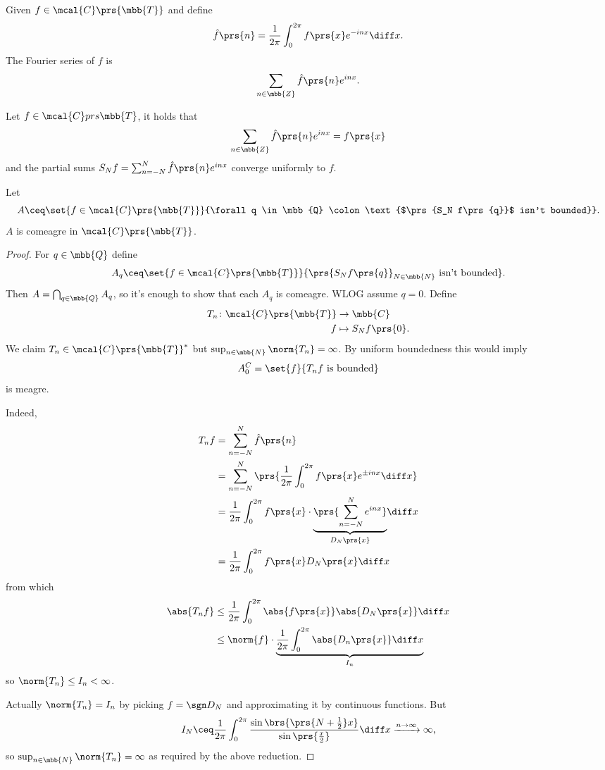 \documentclass[10pt, twoside]{book}
\begin{document}
\begin{definition}
Given $f \in \mcal{C}\prs{\mbb{T}}$ and define
\[\hat{f}\prs{n} = \frac{1}{2 \pi} \int_0^{2 \pi} f\prs{x} e^{-i n x} \diff x \text{.}\]
The Fourier series of $f$ is
\[\sum_{n \in \mbb{Z}} \hat{f}\prs{n} e^{inx} \text{.}\]
\end{definition}

\begin{theorem}[Dirichlet]
Let $f \in \mcal{C}prs{\mbb{T}}$, it holds that
\[\sum_{n \in \mbb{Z}} \hat{f}\prs{n} e^{inx} = f\prs{x}\]
and the partial sums $S_N f = \sum_{n = - N}^N \hat{f}\prs{n} e^{inx}$ converge uniformly to $f$.
\end{theorem}

\begin{theorem}
Let
\[A \ceq \set{f \in \mcal{C}\prs{\mbb{T}}}{\forall q \in \mbb{Q} \colon \text{$\prs{S_N f\prs{q}}$ isn't bounded}} \text{.}\]
$A$ is comeagre in $\mcal{C}\prs{\mbb{T}}$.
\end{theorem}

\begin{proof}
For $q \in \mbb{Q}$ define
\[A_q \ceq \set{f \in \mcal{C}\prs{\mbb{T}}}{\prs{S_N f\prs{q}}_{N \in \mbb{N}} \text{ isn't bounded}} \text{.}\]
Then $A = \bigcap_{q \in \mbb{Q}} A_q$, so it's enough to show that each $A_q$ is comeagre. WLOG assume $q = 0$.
Define
\begin{align*}
T_n \colon \mcal{C}\prs{\mbb{T}} &\to \mbb{C} \\
f &\mapsto S_N f\prs{0} \text{.}
\end{align*}
We claim $T_n \in \mcal{C}\prs{\mbb{T}}^*$ but $\sup_{n \in \mbb{N}} \norm{T_n} = \infty$.
By uniform boundedness this would imply
\[A_0^C = \set{f}{T_n f \text{ is bounded}}\]
is meagre.

Indeed,
\begin{align*}
T_n f &=
\sum_{n = -N}^N \hat{f}\prs{n}
\\&=
\sum_{n = -N}^N \prs{\frac{1}{2 \pi} \int_0^{2 \pi} f\prs{x} e^{\pm inx} \diff x}
\\&=
\frac{1}{2 \pi} \int_0^{2 \pi} f\prs{x} \cdot \underset{D_N\prs{x}}{\underbrace{\prs{\sum_{n = -N}^N e^{inx}}}} \diff x
\\&=
\frac{1}{2 \pi} \int_0^{2 \pi} f\prs{x} D_N\prs{x} \diff x
\end{align*}
from which
\begin{align*}
\abs{T_n f} &\leq
\frac{1}{2 \pi} \int_0^{2 \pi} \abs{f\prs{x}} \abs{D_N\prs{x}} \diff x
\\&\leq
\norm{f} \cdot \underset{I_n}{\underbrace{\frac{1}{2\pi} \int_0^{2 \pi} \abs{D_n\prs{x}} \diff x}}
\end{align*}
so $\norm{T_n} \leq I_n < \infty$.

Actually $\norm{T_n} = I_n$ by picking $f = \sgn D_N$ and approximating it by continuous functions.
But
\begin{align*}
I_N \ceq \frac{1}{2 \pi} \int_0^{2 \pi} \frac{\sin \brs{\prs{N + \frac{1}{2}} x}}{\sin\prs{\frac{x}{2}}} \diff x \xrightarrow{n \to \infty} \infty \text{,}
\end{align*}
so $\sup_{n \in \mbb{N}} \norm{T_n} = \infty$ as required by the above reduction.
\end{proof}
\end{document}
